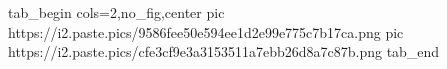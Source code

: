  
 
 
 
 

\ifcmt
  tab_begin cols=2,no_fig,center
     pic https://i2.paste.pics/9586fee50e594ee1d2e99e775c7b17ca.png
		 pic https://i2.paste.pics/cfe3cf9e3a3153511a7ebb26d8a7c87b.png
  tab_end
\fi
